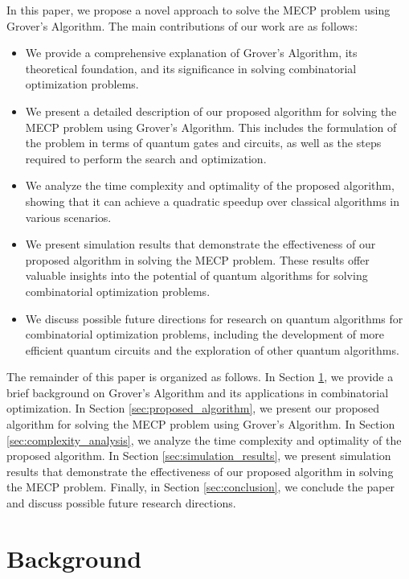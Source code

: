 In this paper, we propose a novel approach to solve the MECP problem using Grover's Algorithm. The main contributions of our work are as follows:

\begin{itemize}
    \item We provide a comprehensive explanation of Grover's Algorithm, its theoretical foundation, and its significance in solving combinatorial optimization problems.
    \item We present a detailed description of our proposed algorithm for solving the MECP problem using Grover's Algorithm. This includes the formulation of the problem in terms of quantum gates and circuits, as well as the steps required to perform the search and optimization.
    \item We analyze the time complexity and optimality of the proposed algorithm, showing that it can achieve a quadratic speedup over classical algorithms in various scenarios.
    \item We present simulation results that demonstrate the effectiveness of our proposed algorithm in solving the MECP problem. These results offer valuable insights into the potential of quantum algorithms for solving combinatorial optimization problems.
    \item We discuss possible future directions for research on quantum algorithms for combinatorial optimization problems, including the development of more efficient quantum circuits and the exploration of other quantum algorithms.
\end{itemize}

The remainder of this paper is organized as follows. In Section \ref{sec:background}, we provide a brief background on Grover's Algorithm and its applications in combinatorial optimization. In Section \ref{sec:proposed_algorithm}, we present our proposed algorithm for solving the MECP problem using Grover's Algorithm. In Section \ref{sec:complexity_analysis}, we analyze the time complexity and optimality of the proposed algorithm. In Section \ref{sec:simulation_results}, we present simulation results that demonstrate the effectiveness of our proposed algorithm in solving the MECP problem. Finally, in Section \ref{sec:conclusion}, we conclude the paper and discuss possible future research directions.

\section{Background} \label{sec:background}

